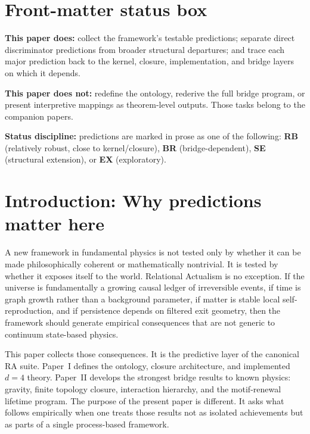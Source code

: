 \documentclass[11pt]{article}
\begin{document}
\begin{abstract}
The paper also develops a unifying theme that has become clearer in recent work: persistence is not primitive and decay is not accidental. Across scales, structures survive when cheap exit paths are filtered or blocked, and fail when they are not. This principle appears first in the particle lifetime program and is then extended cautiously into the domains of cosmology, chemistry, biology, and agency. In this sense, the predictive layer of RA is not merely a list of disconnected tests. It is the empirical face of a self-organizing and self-stabilizing universe.
\end{abstract}

\section*{Front-matter status box}
\noindent\textbf{This paper does:} collect the framework's testable predictions; separate direct discriminator predictions from broader structural departures; and trace each major prediction back to the kernel, closure, implementation, and bridge layers on which it depends.

\noindent\textbf{This paper does not:} redefine the ontology, rederive the full bridge program, or present interpretive mappings as theorem-level outputs. Those tasks belong to the companion papers.

\noindent\textbf{Status discipline:} predictions are marked in prose as one of the following: \textbf{RB} (relatively robust, close to kernel/closure), \textbf{BR} (bridge-dependent), \textbf{SE} (structural extension), or \textbf{EX} (exploratory).

\section{Introduction: Why predictions matter here}
A new framework in fundamental physics is not tested only by whether it can be made philosophically coherent or mathematically nontrivial. It is tested by whether it exposes itself to the world. Relational Actualism is no exception. If the universe is fundamentally a growing causal ledger of irreversible events, if time is graph growth rather than a background parameter, if matter is stable local self-reproduction, and if persistence depends on filtered exit geometry, then the framework should generate empirical consequences that are not generic to continuum state-based physics.

This paper collects those consequences. It is the predictive layer of the canonical RA suite. Paper~I defines the ontology, closure architecture, and implemented $d=4$ theory. Paper~II develops the strongest bridge results to known physics: gravity, finite topology closure, interaction hierarchy, and the motif-renewal lifetime program. The purpose of the present paper is different. It asks what follows empirically when one treats those results not as isolated achievements but as parts of a single process-based framework.
\end{document}

